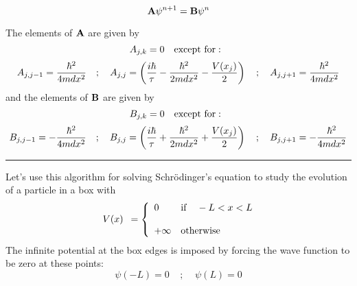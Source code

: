 \begin{enumerate}
\begin{equation}
    {\bf A} \psi^{n+1} =
    {\bf B} \psi^n
\end{equation}

The elements of ${\bf A}$ are given by
\begin{displaymath}
    A_{j,k}=0~~~{\rm except~for:~~}
\end{displaymath}
\begin{equation}
    A_{j,j-1}={\hbar^2\over 4 m dx^2} ~~~;~~~
    A_{j,j}=\left ({i \hbar\over \tau} - {\hbar^2\over 2 m dx^2} -
  {V(x_j)\over 2} \right)~~~;~~~
    A_{j,j+1}={\hbar^2\over 4 m dx^2}
    \label{eqA}
\end{equation}
and the elements of ${\bf B}$ are given by
\begin{displaymath}
    B_{j,k}=0~~~{\rm except~for:~~}
\end{displaymath}
\begin{equation}
    B_{j,j-1} = -{\hbar^2\over 4 m dx^2}  ~~~;~~~
    B_{j,j}=\left({i \hbar\over \tau} + {\hbar^2\over 2 m dx^2} +
  {V(x_j)\over 2} \right) ~~~;~~~
    B_{j,j+1}= -{\hbar^2\over 4 m dx^2}
    \label{eqB}
\end{equation}
\else
\noindent\rule{5 in}{0.01 in}
\fi
{}

Let's use this algorithm for solving Schr\"{o}dinger's equation
to study the evolution of a particle in a box with
\begin{equation}
\begin{array}{c}
 \\
V(x) \\
 \\
\end{array}
=
\left\{
\begin{array}{ll}
0 & {\rm if~~~} -L < x < L \\
 & \\
+\infty & {\rm otherwise} \\
\end{array}
\right.
\end{equation}
The infinite potential at the box edges is imposed by forcing the
wave function to be zero at these points: 
\begin{equation}
    \psi(-L)=0~~~~~;~~~~~\psi(L)=0
\end{equation}


\end{enumerate}
